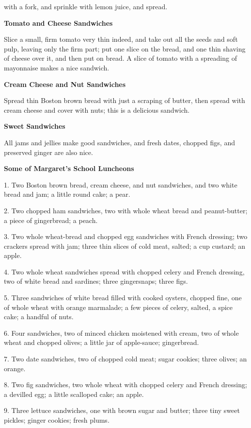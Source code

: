 \documentclass[11pt]{book}
\newcommand{\indpar}{\par\noindent\hspace*{\parindent}}
\newcommand{\instruction}{\indpar}
\newenvironment{RecipeTitle}{\medskip\begin{center}\large\bf }{\end{center}\smallskip}
\newenvironment{FoodTypeTitle}{\begin{center}\large\bf }{\end{center}}
\begin{document}
with a fork, and sprinkle with lemon juice, and spread.
\begin{RecipeTitle}
Tomato and Cheese Sandwiches\label{tomato_and_cheese_sandwiches}
\end{RecipeTitle}
\instruction  Slice a small, firm tomato very thin indeed, and take out
all the seeds and soft pulp, leaving only the firm part;
put one slice on the bread, and one thin shaving of cheese
over it, and then put on bread.  A slice of tomato with a
spreading of mayonnaise makes a nice sandwich.
\begin{RecipeTitle}
Cream Cheese and Nut Sandwiches\label{cream_cheese_and_nut_sandwiches}
\end{RecipeTitle}
\instruction  Spread thin Boston brown bread with just a scraping of
butter, then spread with cream cheese and cover with nuts;
this is a delicious sandwich.
\begin{RecipeTitle}
Sweet Sandwiches\label{sweet_sandwiches}
\end{RecipeTitle}
\instruction  All jams and jellies make good sandwiches, and fresh dates,
chopped figs, and preserved ginger are also nice.
\begin{FoodTypeTitle}
Some of Margaret's School Luncheons\label{school_luncheons}
\end{FoodTypeTitle}
\indpar  1. Two Boston brown bread, cream cheese, and nut sandwiches,
and two white bread and jam; a little round cake; a pear.
\indpar  2. Two chopped ham sandwiches, two with whole wheat bread
and peanut-butter; a piece of gingerbread; a peach.
\indpar  3. Two whole wheat-bread and chopped egg sandwiches with
French dressing; two crackers spread with jam; three thin
slices of cold meat, salted; a cup custard; an apple.
\indpar  4. Two whole wheat sandwiches spread with chopped celery and
French dressing, two of white bread and sardines; three
gingersnaps; three figs.
\indpar  5. Three sandwiches of white bread filled with cooked oysters,
chopped fine, one of whole wheat with orange marmalade; a few
pieces of celery, salted, a spice cake; a handful of nuts.
\indpar  6. Four sandwiches, two of minced chicken moistened with
cream, two of whole wheat and chopped olives; a little jar
of apple-sauce; gingerbread.
\indpar  7. Two date sandwiches, two of chopped cold meat; sugar
cookies; three olives; an orange.
\indpar  8. Two fig sandwiches, two whole wheat with chopped celery
and French dressing; a devilled egg; a little scalloped cake;
an apple.
\indpar  9. Three lettuce sandwiches, one with brown sugar and butter;
three tiny sweet pickles; ginger cookies; fresh plums.
\end{document}
